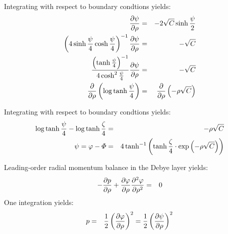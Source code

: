 Integrating with respect to boundary condtions yields:
\begin{eqnarray}  
\frac{\partial \psi}{\partial \rho} &=& -2\sqrt{C}\sinh\frac{\psi}{2} \\  
\left(4\sinh\frac{\psi}{4}\cosh\frac{\psi}{4}\right)^{-1}\frac{\partial \psi}{\partial \rho} &=& -\sqrt{C} \\  
\frac{\left(\tanh\frac{\psi}{4}\right)^{-1}}{4\cosh^2\frac{\psi}{4}}
\frac{\partial \psi}{\partial \rho} &=& -\sqrt{C} \\  
\frac{\partial }{\partial \rho}\left(\log\tanh\frac{\psi}{4}\right) &=& \frac{\partial }{\partial \rho}\left(-\rho \sqrt{C}\right) 
\end{eqnarray}

Integrating with respect to boundary condtions yields:
\begin{eqnarray}
\log\tanh\frac{\psi}{4} - \log\tanh\frac{\zeta}{4} &=& -\rho \sqrt{C} \\
\psi = \varphi - \varPhi &=& 
4 \tanh^{-1}\left(\tanh{\frac{\zeta}{4}} \cdot \exp\left(-\rho \sqrt{C}\right)\right)
\end{eqnarray}

Leading-order radial momentum balance in the Debye layer yields:
\begin{eqnarray} 
- \frac{\partial p}{\partial \rho} + \frac{\partial \varphi}{\partial \rho} \frac{\partial ^2\varphi}{\partial \rho^2} &=& 0
\end{eqnarray}
One integration yields:
\begin{eqnarray} 
p &=& \frac{1}{2}\left(\frac{\partial \varphi}{\partial \rho}\right)^2 = \frac{1}{2}\left(\frac{\partial \psi}{\partial \rho}\right)^2
\end{eqnarray}

